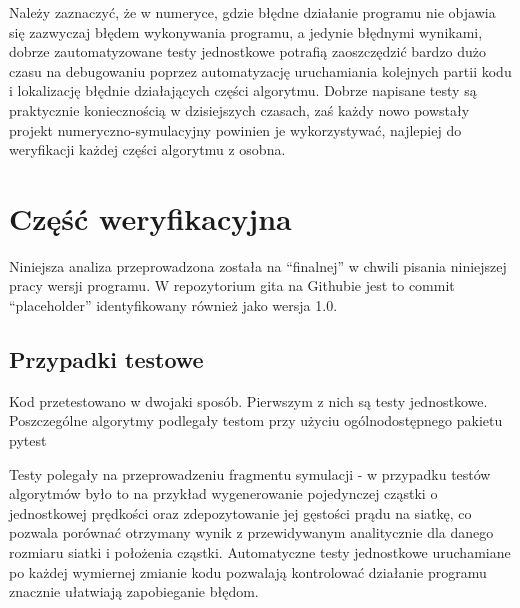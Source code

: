 
    Należy zaznaczyć, że w numeryce, gdzie błędne działanie programu nie objawia się
    zazwyczaj błędem wykonywania programu, a jedynie błędnymi wynikami, dobrze zautomatyzowane
    testy jednostkowe potrafią zaoszczędzić bardzo dużo czasu na debugowaniu
    poprzez automatyzację uruchamiania kolejnych partii kodu i lokalizację błędnie działających
    części algorytmu. Dobrze napisane testy są praktycznie koniecznością w dzisiejszych
    czasach, zaś każdy nowo powstały projekt numeryczno-symulacyjny powinien je
    wykorzystywać, najlepiej do weryfikacji każdej części algorytmu z osobna.


    \section[Weryfikacja]{Część weryfikacyjna} %
    Niniejsza analiza przeprowadzona została na ``finalnej'' w chwili pisania niniejszej pracy wersji programu.
    W repozytorium gita na Githubie jest to commit ``placeholder'' %
    identyfikowany również jako wersja 1.0.

    \subsection{Przypadki testowe}

    Kod przetestowano w dwojaki sposób. Pierwszym z nich są testy jednostkowe.
    Poszczególne algorytmy podlegały testom przy użyciu ogólnodostępnego pakietu pytest %

    Testy polegały na przeprowadzeniu fragmentu symulacji - w przypadku testów algorytmów było to na przykład wygenerowanie
    pojedynczej cząstki o jednostkowej prędkości oraz zdepozytowanie jej gęstości prądu na siatkę, co pozwala porównać
    otrzymany wynik z przewidywanym analitycznie dla danego rozmiaru siatki i położenia cząstki. Automatyczne testy
    jednostkowe uruchamiane po każdej wymiernej zmianie kodu pozwalają kontrolować działanie programu znacznie ułatwiają
    zapobieganie błędom.

